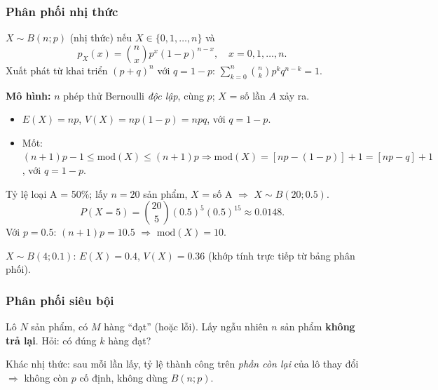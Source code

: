 \documentclass[12pt,a4paper]{article}
\begin{document}
\subsubsection{Phân phối nhị thức}

\begin{dinhnghia}
  $X \sim B(n; p)$ (nhị thức) nếu $X \in \{0, 1, \ldots, n\}$ và
  \[
    p_X(x) = \binom{n}{x} p^x (1-p)^{n-x}, \quad x = 0, 1, \ldots, n.
  \]
  Xuất phát từ khai triển $(p + q)^n$ với $q = 1-p$: $\displaystyle\sum_{k=0}^{n} \binom{n}{k} p^k q^{n-k} = 1$.

  \textbf{Mô hình:} $n$ phép thử Bernoulli \emph{độc lập}, cùng $p$; $X$ = số lần $A$ xảy ra.
\end{dinhnghia}

\begin{dinhly}
  \begin{itemize}
    \item $E(X) = np$, \quad $V(X) = np(1-p) = npq$, với $q = 1-p$.
    \item Mốt: $(n+1)p - 1 \le \mathrm{mod}(X) \le (n+1)p \Rightarrow \mathrm{mod}(X) = [np - (1-p)] + 1 = [np - q] + 1$, với $q = 1-p$.
  \end{itemize}
\end{dinhly}

\begin{vidu}[title={Kiểm tra 20 sản phẩm}]
Tỷ lệ loại A = 50\%; lấy $n = 20$ sản phẩm, $X$ = số A $\Rightarrow$ $X \sim B(20; 0.5)$.
\[
  P(X = 5) = \binom{20}{5}(0.5)^5(0.5)^{15} \approx 0.0148.
\]
Với $p = 0.5$: $(n+1)p = 10.5$ $\Rightarrow$ $\mathrm{mod}(X) = 10$.
\end{vidu}

\begin{vidu}[title={Bít lỗi}]
$X \sim B(4; 0.1)$: $E(X) = 0.4$, $V(X) = 0.36$ (khớp tính trực tiếp từ bảng phân phối).
\end{vidu}

\subsubsection{Phân phối siêu bội}

\begin{dongco}[title={Động cơ -- Lấy mẫu không hoàn lại}]
Lô $N$ sản phẩm, có $M$ hàng ``đạt'' (hoặc lỗi). Lấy ngẫu nhiên $n$ sản phẩm \textbf{không trả lại}. Hỏi: có đúng $k$ hàng đạt?

Khác nhị thức: sau mỗi lần lấy, tỷ lệ thành công trên \emph{phần còn lại} của lô thay đổi $\Rightarrow$ không còn $p$ cố định, không dùng $B(n;p)$.
\end{dongco}
\end{document}
